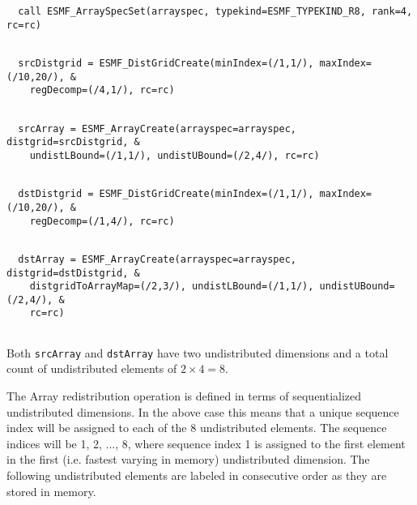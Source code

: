  \begin{verbatim}
  call ESMF_ArraySpecSet(arrayspec, typekind=ESMF_TYPEKIND_R8, rank=4, rc=rc)
 
\end{verbatim}
 

 \begin{verbatim}
  srcDistgrid = ESMF_DistGridCreate(minIndex=(/1,1/), maxIndex=(/10,20/), &
    regDecomp=(/4,1/), rc=rc)
 
\end{verbatim}
 

 \begin{verbatim}
  srcArray = ESMF_ArrayCreate(arrayspec=arrayspec, distgrid=srcDistgrid, &
    undistLBound=(/1,1/), undistUBound=(/2,4/), rc=rc)
 
\end{verbatim}
 

 \begin{verbatim}
  dstDistgrid = ESMF_DistGridCreate(minIndex=(/1,1/), maxIndex=(/10,20/), &
    regDecomp=(/1,4/), rc=rc)
 
\end{verbatim}
 
 

 \begin{verbatim}
  dstArray = ESMF_ArrayCreate(arrayspec=arrayspec, distgrid=dstDistgrid, &
    distgridToArrayMap=(/2,3/), undistLBound=(/1,1/), undistUBound=(/2,4/), &
    rc=rc)
 
\end{verbatim}
 

   Both {\tt srcArray} and {\tt dstArray} have two undistributed dimensions and
   a total count of undistributed elements of $ 2 \times 4 = 8$.
  
   The Array redistribution operation is defined in terms of sequentialized
   undistributed dimensions. In the above case this means that a unique sequence
   index will be assigned to each of the 8 undistributed elements. The sequence
   indices will be 1, 2, ..., 8, where sequence index 1 is assigned to the first
   element in the first (i.e. fastest varying in memory) undistributed dimension.
   The following undistributed elements are labeled in consecutive order as they
   are stored in memory. 

